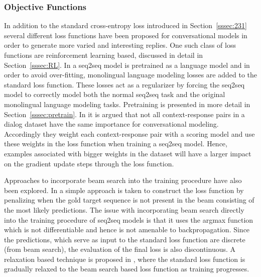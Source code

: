 \documentclass[12pt]{article}
\begin{document}
\subsubsection{Objective Functions} \label{sssec:functions}
In addition to the standard cross-entropy loss introduced in Section~\ref{sssec:231} several different loss functions have been proposed for conversational models in order to generate more varied and interesting replies. One such class of loss functions are reinforcement learning based, discussed in detail in Section~\ref{sssec:RL}. In \cite{Ramachandran:2016} a seq2seq model is pretrained as a language model and in order to avoid over-fitting, monolingual language modeling losses are added to the standard loss function. These losses act as a regularizer by forcing the seq2seq model to correctly model both the normal seq2seq task and the original monolingual language modeling tasks. Pretraining is presented in more detail in Section~\ref{sssec:pretrain}. In \cite{Lison:2017} it is argued that not all context-response pairs in a dialog dataset have the same importance for conversational modeling. Accordingly they weight each context-response pair with a scoring model and use these weights in the loss function when training a seq2seq model. Hence, examples associated with bigger weights in the dataset will have a larger impact on the gradient update steps through the loss function. 

Approaches to incorporate beam search into the training procedure have also been explored. In \cite{Wiseman:2016} a simple approach is taken to construct the loss function by penalizing when the gold target sequence is not present in the beam consisting of the most likely predictions. The issue with incorporating beam search directly into the training procedure of seq2seq models is that it uses the argmax function which is not differentiable and hence is not amenable to backpropagation. Since the predictions, which serve as input to the standard loss function are discrete (from beam search), the evaluation of the final loss is also discontinuous. A relaxation based technique is proposed in \cite{Goyal:2017}, where the standard loss function is gradually relaxed to the beam search based loss function as training progresses.
\end{document}
